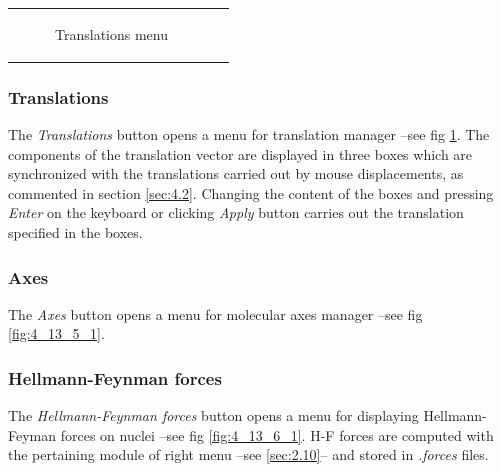 \documentclass[10pt]{article}
\begin{document}
\begin{center}
\begin{tabular}{lr}
\begin{minipage}{.35\linewidth}
\begin{figure}[H]
\begin{center}
        \end{center}
        \vspace*{1mm}
        \caption{Translations menu \label{fig:4_13_4_1}}
    \end{figure}
\end{minipage}
\end{tabular}
\end{center}
\vspace*{5mm}

\subsubsection{Translations \label{sec:4.13.4}}

The {\it Translations} button opens a menu for translation manager --see fig \ref{fig:4_13_4_1}.
The components of the translation vector are displayed in three boxes which
are synchronized with the translations carried out by mouse displacements,
as commented in section \ref{sec:4.2}. Changing the content of the boxes and pressing {\it Enter} on the keyboard or clicking {\it Apply} button carries out the translation specified in the boxes.

\subsubsection{Axes \label{sec:4.13.5}}

The {\it Axes} button opens a menu for molecular axes manager --see fig \ref{fig:4_13_5_1}.

\subsubsection{Hellmann-Feynman forces \label{sec:4.13.6}}

The {\it Hellmann-Feynman forces} button opens a menu for displaying Hellmann-Feyman forces 
on nuclei --see fig \ref{fig:4_13_6_1}. H-F forces are computed with the pertaining
module of right menu --see \ref{sec:2.10}--
and stored in {\it .forces} files.
\end{document}
